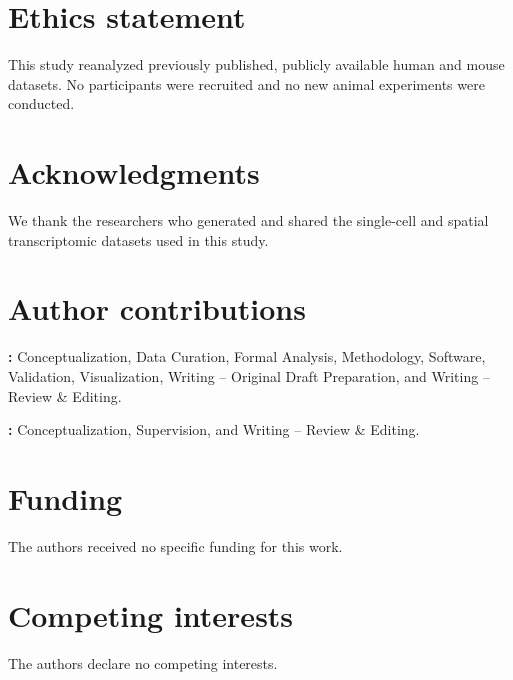 \section*{Ethics statement}
This study reanalyzed previously published, publicly available human and mouse datasets. No participants were recruited and no new animal experiments were conducted.

\section*{Acknowledgments}
We thank the researchers who generated and shared the single-cell and spatial transcriptomic datasets used in this study.

\section*{Author contributions}
\begingroup\raggedright
\noindent\textbf{\firstauthorname:} Conceptualization, Data Curation, Formal Analysis, Methodology, Software, Validation, Visualization, Writing -- Original Draft Preparation, and Writing -- Review \& Editing.\par
\smallskip
\noindent\textbf{\secondauthorname:} Conceptualization, Supervision, and Writing -- Review \& Editing.\par
\endgroup

\section*{Funding}
The authors received no specific funding for this work.

\section*{Competing interests}
The authors declare no competing interests.
